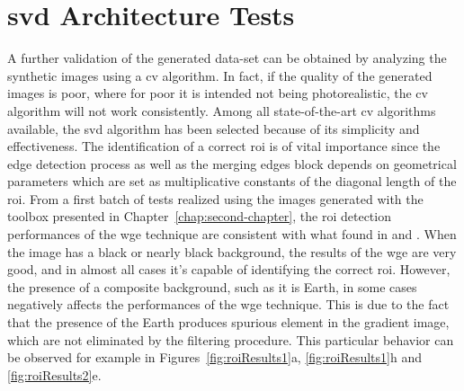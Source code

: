\section{\acrshort{svd} Architecture Tests}
A further validation of the generated data-set can be obtained by analyzing the synthetic images using a \acrshort{cv} algorithm. In fact, if the quality of the generated images is poor, where for poor it is intended not being photorealistic, the \acrshort{cv} algorithm will not work consistently. Among all state-of-the-art \acrshort{cv} algorithms available, the \acrshort{svd} algorithm has been selected because of its simplicity and effectiveness. The identification of a correct \acrshort{roi} is of vital importance since the edge detection process as well as the merging edges block depends on geometrical parameters which are set as multiplicative constants of the diagonal length of the \acrshort{roi}. From a first batch of tests realized using the images generated with the toolbox presented in Chapter~\ref{chap:second-chapter}, the \acrshort{roi} detection performances of the \acrshort{wge} technique are consistent with what found in \cite{Sharma2018} and \cite{fracchio2019}. When the image has a black or nearly black background, the results of the \acrshort{wge} are very good, and in almost all cases it's capable of identifying the correct \acrshort{roi}. However, the presence of a composite background, such as it is Earth, in some cases negatively affects the performances of the \acrshort{wge} technique. This is due to the fact that the presence of the Earth produces spurious element in the gradient image, which are not eliminated by the filtering procedure. This particular behavior can be observed for example in Figures~\ref{fig:roiResults1}a, \ref{fig:roiResults1}h and \ref{fig:roiResults2}e.

